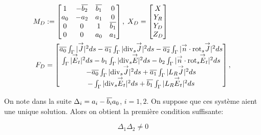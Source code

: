 			\begin{align*}
				M_D&:=
				\begin{bmatrix}
					1&-{\overline{b_2}}&{\overline{b_1}}&0\\
					a_0&-a_2&a_1&0\\
					0&0&1&{\overline{b_1}}\\
					0&0&a_0&a_1\\
				\end{bmatrix},\;
				X_D =
				\begin{bmatrix}
					X\\
					Y_R\\
					Y_D\\
					Z_D
				\end{bmatrix}\\
				F_D &=
				\begin{bmatrix}
					{\overline{a_0}} \int_\Gamma |{\overset{\rightarrow}{J}}|^2ds - {\overline{a_1}} \int_\Gamma |{\operatorname{div}_s} {\overset{\rightarrow}{J}}|^2 ds - {\overline{a_2}} \int_\Gamma |{\overset{\rightarrow}{n}} \cdot {{\operatorname{rot}}_s} {\overset{\rightarrow}{J}}|^2 ds \\
					\int_\Gamma |{\overset{\rightarrow}{E}}_t|^2 ds  - b_1 \int_\Gamma | {\operatorname{div}_s} {\overset{\rightarrow}{E}} |^2 ds - b_2 \int_\Gamma | {\overset{\rightarrow}{n}} \cdot {{\operatorname{rot}}_s} {\overset{\rightarrow}{E}}_t|^2 ds \\
					-{\overline{a_0}} \int_\Gamma |{\operatorname{div}_s} {\overset{\rightarrow}{J}}|^2ds + {\overline{a_1}} \int_\Gamma | L_R {\overset{\rightarrow}{J}}|^2 ds \\
					-\int_\Gamma | {\operatorname{div}_s} {\overset{\rightarrow}{E}}_t |^2 ds  + {\overline{b_1}} \int_\Gamma | L_R {\overset{\rightarrow}{E}}_t|^2 ds
				\end{bmatrix},\;
			\end{align*}

			On note dans la suite \(\Delta_i = a_i-{\overline{b_i}}a_0\), \(i=1,2\). On suppose que ces système aient une unique solution. Alors on obtient la première condition suffisante:

			\begin{equation}
				\label{eq:unicite:ci3:csu3-cn-det}
				\Delta_1\Delta_2 \not = 0
			\end{equation}

